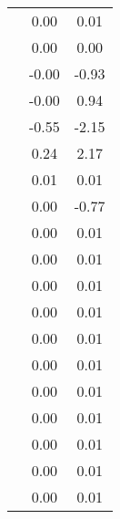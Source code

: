 \begin{table}
\begin{tabular}{c|cc|}
\multicolumn{1}{|c|}{} & \multicolumn{1}{|c|}{      0.00} & \multicolumn{1}{|c|}{      0.01} \\ 
\multicolumn{1}{|c|}{} & \multicolumn{1}{|c|}{      0.00} & \multicolumn{1}{|c|}{      0.00} \\ 
\multicolumn{1}{|c|}{} & \multicolumn{1}{|c|}{     -0.00} & \multicolumn{1}{|c|}{     -0.93} \\ 
\multicolumn{1}{|c|}{} & \multicolumn{1}{|c|}{     -0.00} & \multicolumn{1}{|c|}{      0.94} \\ 
\multicolumn{1}{|c|}{} & \multicolumn{1}{|c|}{     -0.55} & \multicolumn{1}{|c|}{     -2.15} \\ 
\multicolumn{1}{|c|}{} & \multicolumn{1}{|c|}{      0.24} & \multicolumn{1}{|c|}{      2.17} \\ 
\multicolumn{1}{|c|}{} & \multicolumn{1}{|c|}{      0.01} & \multicolumn{1}{|c|}{      0.01} \\ 
\multicolumn{1}{|c|}{} & \multicolumn{1}{|c|}{      0.00} & \multicolumn{1}{|c|}{     -0.77} \\ 
\multicolumn{1}{|c|}{} & \multicolumn{1}{|c|}{      0.00} & \multicolumn{1}{|c|}{      0.01} \\ 
\multicolumn{1}{|c|}{} & \multicolumn{1}{|c|}{      0.00} & \multicolumn{1}{|c|}{      0.01} \\ 
\multicolumn{1}{|c|}{} & \multicolumn{1}{|c|}{      0.00} & \multicolumn{1}{|c|}{      0.01} \\ 
\multicolumn{1}{|c|}{} & \multicolumn{1}{|c|}{      0.00} & \multicolumn{1}{|c|}{      0.01} \\ 
\multicolumn{1}{|c|}{} & \multicolumn{1}{|c|}{      0.00} & \multicolumn{1}{|c|}{      0.01} \\ 
\multicolumn{1}{|c|}{} & \multicolumn{1}{|c|}{      0.00} & \multicolumn{1}{|c|}{      0.01} \\ 
\multicolumn{1}{|c|}{} & \multicolumn{1}{|c|}{      0.00} & \multicolumn{1}{|c|}{      0.01} \\ 
\multicolumn{1}{|c|}{} & \multicolumn{1}{|c|}{      0.00} & \multicolumn{1}{|c|}{      0.01} \\ 
\multicolumn{1}{|c|}{} & \multicolumn{1}{|c|}{      0.00} & \multicolumn{1}{|c|}{      0.01} \\ 
\multicolumn{1}{|c|}{} & \multicolumn{1}{|c|}{      0.00} & \multicolumn{1}{|c|}{      0.01} \\ 
\multicolumn{1}{|c|}{} & \multicolumn{1}{|c|}{      0.00} & \multicolumn{1}{|c|}{      0.01} \\ 

\end{tabular}
\end{table}
